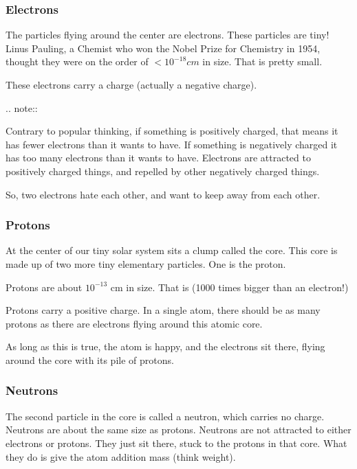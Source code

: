 \subsubsection{Electrons}

The particles flying around the center are electrons.  These particles are
tiny! Linus Pauling, a Chemist who won the Nobel Prize for Chemistry in 1954,
thought they were on the order of $< 10^{-18}cm$ in size. That is pretty
small.

These electrons carry a charge (actually a negative charge). 

..  note::

    Contrary to popular thinking, if something is positively charged, that
    means it has fewer electrons than it wants to have. If something is
    negatively charged it has too many electrons than it wants to have.
    Electrons are attracted to positively charged things, and repelled
    by other negatively charged things.

    So, two electrons hate each other, and want to keep away from each
    other.

\subsubsection{Protons}

At the center of our tiny solar system sits a clump called the core. This
core is made up of two more tiny elementary particles. One is the
proton.

Protons are about $10^{-13}$ cm in size. That is
(1000 times bigger than an electron!)

Protons carry a positive charge. In a single atom, there should be as
many protons as there are electrons flying around this atomic core. 

As long as this is true, the atom is happy, and the electrons sit there, flying
around the core with its pile of protons.

\subsubsection{Neutrons}

The second particle in the core is called a neutron, which carries no
charge. Neutrons are about the same size as protons. Neutrons are
not attracted to either electrons or protons. They just sit there,
stuck to the protons in that core. What they do is give the atom addition
mass (think weight).

